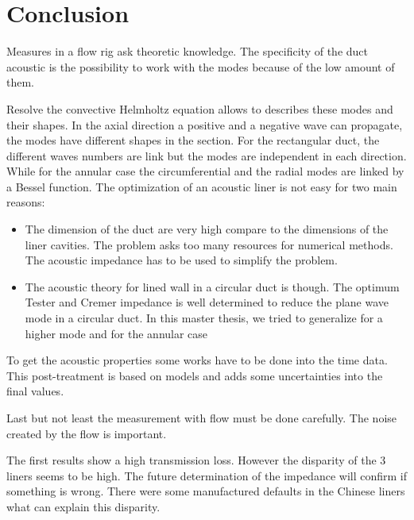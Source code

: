 \section{Conclusion}
\setlength{\parindent}{20pt}
 \indent Measures in a flow rig ask theoretic knowledge. The specificity of the duct acoustic is the possibility to work with the modes because of the low amount of them. 
 
 Resolve the convective Helmholtz equation allows to describes these modes and their shapes. In the axial direction a positive and a negative wave can propagate, the modes have different shapes in the section. For the rectangular duct, the different waves numbers are link but the modes are independent in each direction. While for the annular case the circumferential and the radial modes are linked by a Bessel function.
The optimization of an acoustic liner is not easy for two main reasons: 
\begin{itemize}
    \item The dimension of the duct are very high compare to the dimensions of the liner cavities. The problem asks too many resources for numerical methods. The acoustic impedance has to be used to simplify the problem.
    \item The acoustic theory for lined wall in a circular duct is though. The optimum Tester and Cremer impedance is well determined to reduce the plane wave mode in a circular duct. In this master thesis, we tried to generalize for a higher mode and for the annular case 
\end{itemize}
\indent To get the acoustic properties some works have to be done into the time data. This post-treatment is based on models and adds some uncertainties into the final values.

Last but not least the measurement with flow must be done carefully. The noise created by the flow is important.

The first results show a high transmission loss. However the disparity of the 3 liners seems to be high. The future determination of the impedance will confirm if something is wrong. There were some manufactured defaults in the Chinese liners what can explain this disparity.
\clearpage

